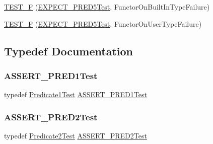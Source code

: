 \begin{DoxyCompactItemize}
\item 
\mbox{\hyperlink{googletest-master_2googletest_2test_2gtest__pred__impl__unittest_8cc_a7c8988c2d19eb5ed71e3bd4a0f69f96d}{T\+E\+S\+T\+\_\+F}} (\mbox{\hyperlink{googletest-master_2googletest_2test_2gtest__pred__impl__unittest_8cc_a9e7ab56ee0997fdc5c9f7318d0f1094c}{E\+X\+P\+E\+C\+T\+\_\+\+P\+R\+E\+D5\+Test}}, Functor\+On\+Built\+In\+Type\+Failure)
\item 
\mbox{\hyperlink{googletest-master_2googletest_2test_2gtest__pred__impl__unittest_8cc_ada0ed61c55660de8027dfe787136c0d8}{T\+E\+S\+T\+\_\+F}} (\mbox{\hyperlink{googletest-master_2googletest_2test_2gtest__pred__impl__unittest_8cc_a9e7ab56ee0997fdc5c9f7318d0f1094c}{E\+X\+P\+E\+C\+T\+\_\+\+P\+R\+E\+D5\+Test}}, Functor\+On\+User\+Type\+Failure)
\end{DoxyCompactItemize}


\subsection{Typedef Documentation}
\mbox{\label{googletest-master_2googletest_2test_2gtest__pred__impl__unittest_8cc_a14984d780d451975d1895e5de7c9dbca}} 
\subsubsection{\texorpdfstring{ASSERT\_PRED1Test}{ASSERT\_PRED1Test}}
{\footnotesize\ttfamily typedef \mbox{\hyperlink{class_predicate1_test}{Predicate1\+Test}} \mbox{\hyperlink{googletest-master_2googletest_2test_2gtest__pred__impl__unittest_8cc_a14984d780d451975d1895e5de7c9dbca}{A\+S\+S\+E\+R\+T\+\_\+\+P\+R\+E\+D1\+Test}}}

\mbox{\label{googletest-master_2googletest_2test_2gtest__pred__impl__unittest_8cc_a1b78024909002227ea625b831d27ea8b}} 
\subsubsection{\texorpdfstring{ASSERT\_PRED2Test}{ASSERT\_PRED2Test}}
{\footnotesize\ttfamily typedef \mbox{\hyperlink{class_predicate2_test}{Predicate2\+Test}} \mbox{\hyperlink{googletest-master_2googletest_2test_2gtest__pred__impl__unittest_8cc_a1b78024909002227ea625b831d27ea8b}{A\+S\+S\+E\+R\+T\+\_\+\+P\+R\+E\+D2\+Test}}}

